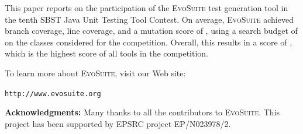 \documentclass[sigconf,review,anonymous]{acmart}
\newcommand{\EVOSUITE}{\textsc{EvoSuite}\xspace}
\begin{document}
This paper reports on the participation of the \EVOSUITE test generation tool
in the tenth SBST Java Unit Testing Tool Contest. On average, \EVOSUITE achieved
\avgConditionsCoverageRatioLong branch coverage, \avgLinesCoverageRatioLong line coverage, 
and a mutation score of \avgMutantsCoverageRatioLong, using a
search budget of \budgetLong on the \cuts classes considered for the competition.
Overall, this results in a score of \score, which is the highest score of all
tools in the competition.


To learn more about \EVOSUITE, visit our Web site:
\begin{center}
\texttt{http://www.evosuite.org}
\end{center}



\textbf{Acknowledgments:} Many thanks to all the contributors to
\EVOSUITE.
This project has been supported by EPSRC project %
EP/N023978/2.




\balance
\end{document}

